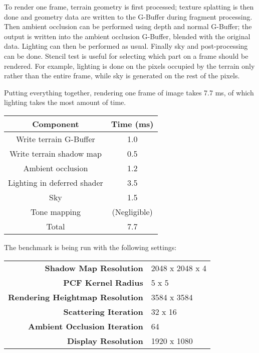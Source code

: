 \documentclass[oneside, a4paper]{report}
\begin{document}
    To render one frame, terrain geometry is first processed; texture splatting is then done and geometry data are written to the G-Buffer during fragment processing. Then ambient occlusion can be performed using depth and normal G-Buffer; the output is written into the ambient occlusion G-Buffer, blended with the original data. Lighting can then be performed as usual. Finally sky and post-processing can be done. Stencil test is useful for selecting which part on a frame should be rendered. For example, lighting is done on the pixels occupied by the terrain only rather than the entire frame, while sky is generated on the rest of the pixels.
    
    Putting everything together, rendering one frame of image takes 7.7 ms, of which lighting takes the most amount of time.

    \begin{center}
        \begin{tabular}{|c|c|}
            \hline
            Component & Time (ms) \\
            \hline
            \hline
            Write terrain G-Buffer & 1.0 \\
            \hline
            Write terrain shadow map & 0.5 \\
            \hline
            Ambient occlusion & 1.2 \\
            \hline
            Lighting in deferred shader & 3.5 \\
            \hline
            Sky & 1.5 \\
            \hline
            Tone mapping & (Negligible) \\
            \hline
            Total & 7.7 \\
            \hline
        \end{tabular}
    \end{center}

    The benchmark is being run with the following settings:

    \begin{tabular}{rl}
        \textbf{Shadow Map Resolution} & 2048 x 2048 x 4 \\
        \textbf{PCF Kernel Radius} & 5 x 5 \\
        \textbf{Rendering Heightmap Resolution} & 3584 x 3584 \\
        \textbf{Scattering Iteration} & 32 x 16 \\
        \textbf{Ambient Occlusion Iteration} & 64 \\
        \textbf{Display Resolution} & 1920 x 1080
    \end{tabular}
\end{document}
